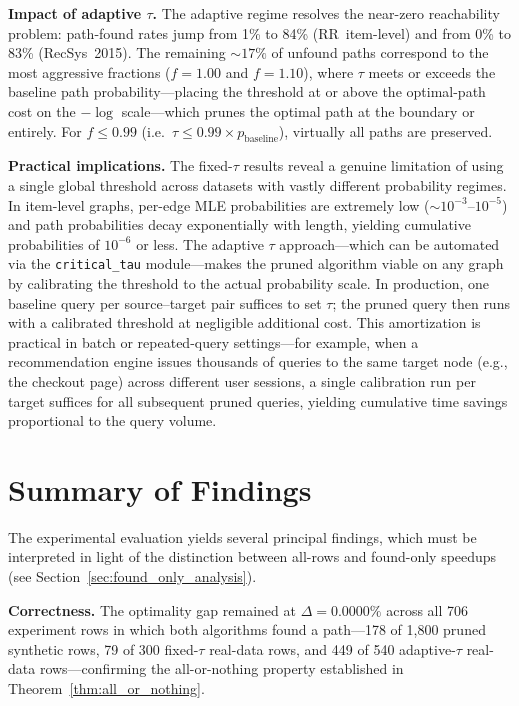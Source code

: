 \textbf{Impact of adaptive $\tau$.} The adaptive regime resolves the near-zero reachability problem: path-found rates jump from 1\% to 84\% (RR~item-level) and from 0\% to 83\% (RecSys~2015). The remaining ${\sim}17\%$ of unfound paths correspond to the most aggressive fractions ($f=1.00$ and $f=1.10$), where $\tau$ meets or exceeds the baseline path probability---placing the threshold at or above the optimal-path cost on the $-\log$ scale---which prunes the optimal path at the boundary or entirely. For $f \leq 0.99$ (i.e.\ $\tau \leq 0.99 \times p_{\text{baseline}}$), virtually all paths are preserved.

\textbf{Practical implications.} The fixed-$\tau$ results reveal a genuine limitation of using a single global threshold across datasets with vastly different probability regimes. In item-level graphs, per-edge MLE probabilities are extremely low ($\sim10^{-3}$--$10^{-5}$) and path probabilities decay exponentially with length, yielding cumulative probabilities of $10^{-6}$ or less. The adaptive $\tau$ approach---which can be automated via the \texttt{critical\_tau} module---makes the pruned algorithm viable on any graph by calibrating the threshold to the actual probability scale. In production, one baseline query per source--target pair suffices to set $\tau$; the pruned query then runs with a calibrated threshold at negligible additional cost. This amortization is practical in batch or repeated-query settings---for example, when a recommendation engine issues thousands of queries to the same target node (e.g., the checkout page) across different user sessions, a single calibration run per target suffices for all subsequent pruned queries, yielding cumulative time savings proportional to the query volume.

\section{Summary of Findings}

The experimental evaluation yields several principal findings, which must be interpreted in light of the distinction between all-rows and found-only speedups (see Section~\ref{sec:found_only_analysis}).

\textbf{Correctness.} The optimality gap remained at $\Delta = 0.0000\%$ across all 706 experiment rows in which both algorithms found a path---178 of 1,800 pruned synthetic rows, 79 of 300 fixed-$\tau$ real-data rows, and 449 of 540 adaptive-$\tau$ real-data rows---confirming the all-or-nothing property established in Theorem~\ref{thm:all_or_nothing}.

